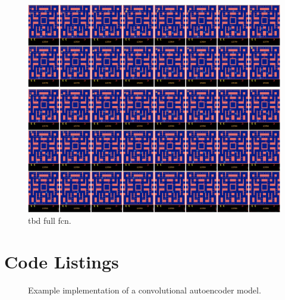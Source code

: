 \begin{figure}[htpb]
	\centering
	\includegraphics[width=1.0\linewidth]{figures/pred/pac/full-long/pred-00.png} 
	\caption[TBD]{tbd full fcn.} \label{fig:pac-pred-full-long}
\end{figure}


\clearpage
\section{Code Listings}

\begin{figure}[h!tb]
  
  \caption[Code: Convolutional Autoencoder]{Example implementation of a convolutional autoencoder model.}\label{code:model}
\end{figure}

